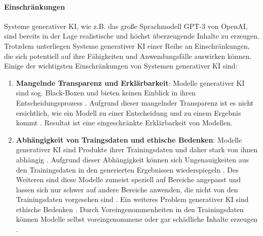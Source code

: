 \paragraph{Einschränkungen}
Systeme generativer KI, wie z.B. das große Sprachmodell GPT-3 von OpenAI, sind bereits in der Lage realistische und höchst überzeugende Inhalte zu erzeugen.
Trotzdem unterliegen Systeme generativer KI einer Reihe an Einschränkungen, die sich potentiell auf ihre Fähigkeiten und Anwendungsfälle auswirken können.
Einige der wichtigsten Einschränkungen von Systemen generativer KI sind:
\begin{enumerate}
    \item \textbf{Mangelnde Transparenz und Erklärbarkeit}: Modelle generativer KI sind sog. Black-Boxen und bieten keinen Einblick in ihren Entscheidungsprozess \cite{explainable-ai-kobold}.
    Aufgrund dieser mangelnder Transparenz ist es nicht ersichtlich, wie ein Modell zu einer Entscheidung und zu einem Ergebnis kommt \cite{explainable-ai-kobold}.
    Resultat ist eine eingeschränkte Erklärbarkeit von Modellen.

    \item \textbf{Abhängigkeit von Traingsdaten und ethische Bedenken}: Modelle generativer KI sind Produkte ihrer Trainingsdaten und daher stark von ihnen abhängig \cite{klinkhammer-genai}.
    Aufgrund dieser Abhängigkeit können sich Ungenauigkeiten aus den Trainingsdaten in den generierten Ergebnissen wiederspiegeln \cite{klinkhammer-genai}.
    Des Weiteren sind diese Modelle zumeist speziell auf Bereiche angepasst und lassen sich nur schwer auf andere Bereiche anwenden, die nicht von den Trainingsdaten vorgesehen sind \cite{klinkhammer-genai}.
    Ein weiteres Problem generativer KI sind ethische Bedenken \cite{klinkhammer-genai}.
    Durch Voreingenommenheiten in den Trainingsdaten können Modelle selbst voreingenommene oder gar schädliche Inhalte erzeugen \cite{klinkhammer-genai}.



\end{enumerate}
